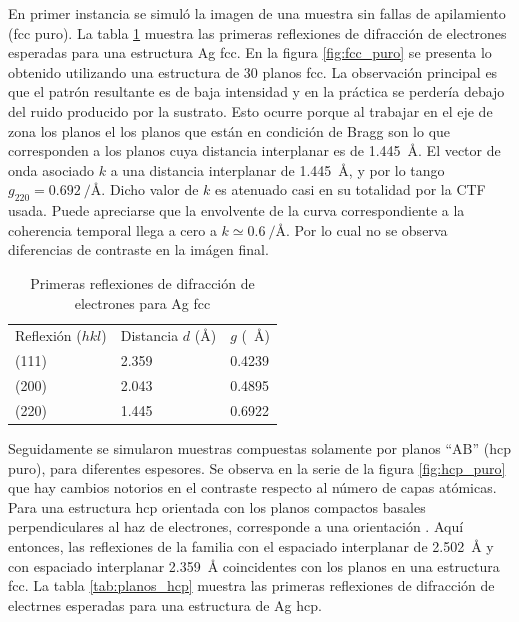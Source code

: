 En primer instancia se simuló la imagen de una muestra sin fallas de apilamiento (fcc puro). La tabla \ref{tab:plans_fcc} muestra las primeras reflexiones de difracción de electrones esperadas para una estructura Ag fcc. En la figura \ref{fig:fcc_puro} se presenta lo obtenido utilizando una estructura de 30 planos fcc. La observación principal es que el patrón resultante es de baja intensidad y en la práctica se perdería debajo del ruido producido por la sustrato. Esto ocurre porque al trabajar en el eje de zona \hkl[111] los planos el los planos que están en condición de Bragg son lo que corresponden a los planos  cuya distancia interplanar es de \qty{1.445}{\angstrom}.
El vector de onda asociado $k$ a una distancia interplanar de \SI{1.445}{\AA}, y por lo tango $g_{220}=\qty{0.692}{\per\angstrom}$. Dicho valor de $k$ es atenuado casi en su totalidad por la CTF usada. Puede apreciarse que la envolvente de la curva correspondiente a la coherencia temporal llega a cero a $k\simeq\qty{0.6}{\per\angstrom}$. Por lo cual no se observa diferencias de contraste en la imágen final.

\begin{table}[h]
	\caption{Primeras reflexiones de difracción de electrones para Ag fcc}
	\centering
	\begin{tabular}{lll}
		\hline
		Reflexión ($hkl$)& Distancia $d$ (\unit{\angstrom})& $g$ (\unit{\per\angstrom})\\
		\hkl(111)& 2.359& 0.4239\\
		\hkl(200)& 2.043& 0.4895\\
		\hkl(220)& 1.445& 0.6922\\
		\hline
	\end{tabular}
	\label{tab:plans_fcc}
\end{table}

Seguidamente se simularon muestras compuestas solamente por planos ``AB'' (hcp puro), para diferentes espesores. Se observa en la serie de la figura \ref{fig:hcp_puro} que hay cambios notorios en el contraste respecto al número de capas atómicas. Para una estructura hcp orientada con los planos compactos basales perpendiculares al haz de electrones, corresponde a una orientación \hkl[0001]. Aquí entonces, las reflexiones de la familia  con el espaciado interplanar de \qty{2.502}{\angstrom} y  con espaciado interplanar \qty{2.359}{\angstrom} coincidentes con los planos  en una estructura fcc. La tabla \ref{tab:planos_hcp} muestra las primeras reflexiones de difracción de electrnes esperadas para una estructura de Ag hcp.

